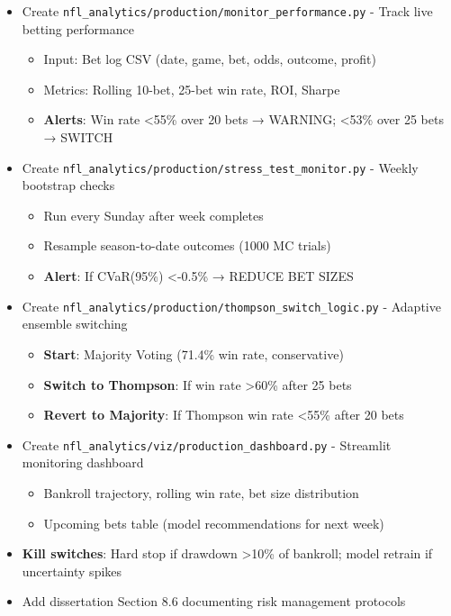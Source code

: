 \begin{itemize}
  \item {} Create \texttt{nfl\_analytics/production/monitor\_performance.py} - Track live betting performance
  \begin{itemize}
    \item Input: Bet log CSV (date, game, bet, odds, outcome, profit)
    \item Metrics: Rolling 10-bet, 25-bet win rate, ROI, Sharpe
    \item \textbf{Alerts}: Win rate <55\% over 20 bets → WARNING; <53\% over 25 bets → SWITCH
  \end{itemize}
  \item {} Create \texttt{nfl\_analytics/production/stress\_test\_monitor.py} - Weekly bootstrap checks
  \begin{itemize}
    \item Run every Sunday after week completes
    \item Resample season-to-date outcomes (1000 MC trials)
    \item \textbf{Alert}: If CVaR(95\%) <-0.5\% → REDUCE BET SIZES
  \end{itemize}
  \item {} Create \texttt{nfl\_analytics/production/thompson\_switch\_logic.py} - Adaptive ensemble switching
  \begin{itemize}
    \item \textbf{Start}: Majority Voting (71.4\% win rate, conservative)
    \item \textbf{Switch to Thompson}: If win rate >60\% after 25 bets
    \item \textbf{Revert to Majority}: If Thompson win rate <55\% after 20 bets
  \end{itemize}
  \item {} Create \texttt{nfl\_analytics/viz/production\_dashboard.py} - Streamlit monitoring dashboard
  \begin{itemize}
    \item Bankroll trajectory, rolling win rate, bet size distribution
    \item Upcoming bets table (model recommendations for next week)
  \end{itemize}
  \item {} \textbf{Kill switches}: Hard stop if drawdown >10\% of bankroll; model retrain if uncertainty spikes
  \item {} Add dissertation Section 8.6 documenting risk management protocols
\end{itemize}

